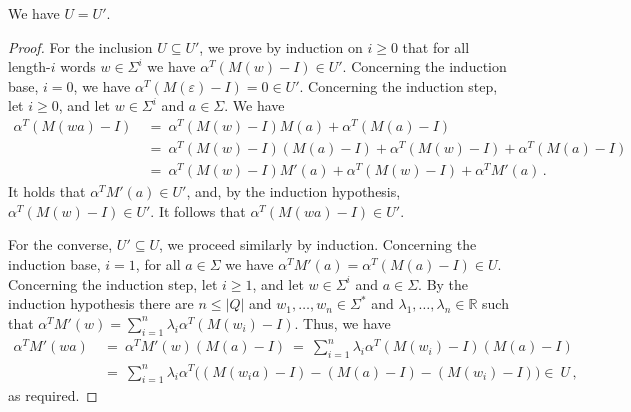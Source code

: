 \begin{lem} \label{lem:U=U'}
We have $U = U'$.
\end{lem}
\begin{proof}
For the inclusion $U \subseteq U'$, we prove by induction on $i \ge 0$ that for all length-$i$ words $w \in \Sigma^i$ we have $\alpha^T (M(w) - I) \in U'$.
Concerning the induction base, $i=0$, we have $\alpha^T (M(\varepsilon) - I) = 0 \in U'$.
Concerning the induction step, let $i \ge 0$, and let $w \in \Sigma^i$ and $a \in \Sigma$.
We have
\begin{align*}
\alpha^T (M(w a) - I)
\ &= \ \alpha^T (M(w) - I) M(a) + \alpha^T (M(a) - I) \\
\ &= \ \alpha^T (M(w) - I) (M(a) - I) + \alpha^T (M(w) - I) + \alpha^T (M(a) - I) \\
\ &= \ \alpha^T (M(w) - I) M'(a) + \alpha^T (M(w) - I) + \alpha^T M'(a)\,.
\end{align*}
It holds that $\alpha^T M'(a) \in U'$, and, by the induction hypothesis, $\alpha^T (M(w) - I) \in U'$.
It follows that $\alpha^T (M(w a) - I) \in U'$.

For the converse, $U' \subseteq U$, we proceed similarly by induction.
Concerning the induction base, $i=1$, for all $a \in \Sigma$ we have $\alpha^T M'(a) = \alpha^T (M(a) - I) \in U$.
Concerning the induction step, let $i \ge 1$, and let $w \in \Sigma^i$ and $a \in \Sigma$.
By the induction hypothesis there are $n \le |Q|$ and $w_1, \ldots, w_n \in \Sigma^*$ and $\lambda_1, \ldots, \lambda_n \in \mathbb{R}$ such that $\alpha^T M'(w) = \sum_{i=1}^n \lambda_i \alpha^T (M(w_i) - I)$.
Thus, we have
\begin{align*}
\alpha^T M'(w a)
\ &= \ \alpha^T M'(w) (M(a) - I) 
\ = \ \sum_{i=1}^n \lambda_i \alpha^T (M(w_i) - I) (M(a) - I) \\
\ &= \ \sum_{i=1}^n \lambda_i \alpha^T \big((M(w_i a) - I) - (M(a) - I) - (M(w_i) - I) \big) \in \ U\,,
\end{align*}
as required.
\end{proof}


